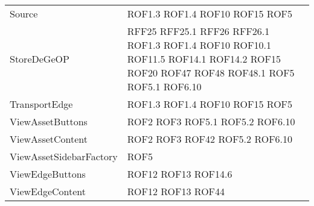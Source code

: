 \begin{longtable}{p{5cm}!{\VRule[1pt]}p{2.5cm}}
		Source & ROF1.3 \newline ROF1.4 \newline ROF10 \newline ROF15 \newline ROF5\\
		StoreDeGeOP & RFF25 \newline RFF25.1 \newline RFF26 \newline RFF26.1 \newline ROF1.3 \newline ROF1.4 \newline ROF10 \newline ROF10.1 \newline ROF11.5 \newline ROF14.1 \newline ROF14.2 \newline ROF15 \newline ROF20 \newline ROF47 \newline ROF48 \newline ROF48.1 \newline ROF5 \newline ROF5.1 \newline ROF6.10\\
		TransportEdge & ROF1.3 \newline ROF1.4 \newline ROF10 \newline ROF15 \newline ROF5\\
		ViewAssetButtons & ROF2 \newline ROF3 \newline ROF5.1 \newline ROF5.2 \newline ROF6.10\\
		ViewAssetContent & ROF2 \newline ROF3 \newline ROF42 \newline ROF5.2 \newline ROF6.10\\
		ViewAssetSidebarFactory & ROF5\\
		ViewEdgeButtons & ROF12 \newline ROF13 \newline ROF14.6\\
		ViewEdgeContent & ROF12 \newline ROF13 \newline ROF44\\

\end{longtable}
